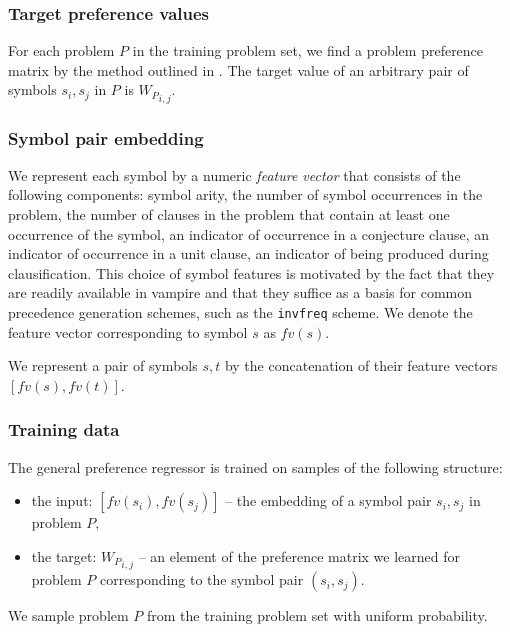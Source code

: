 \subsubsection{Target preference values}
\label{sec:target-preference-values}

For each problem \(P\) in the training problem set,
we find a problem preference matrix by the method outlined in .
The target value of an arbitrary pair of symbols \(s_i, s_j\) in \(P\) is \({W_P}_{i,j}\).

\subsubsection{Symbol pair embedding} \label{sect:embeddings}

We represent each symbol by a numeric \emph{feature vector} that consists of the following components:
symbol arity, %
the number of symbol occurrences in the problem, %
the number of clauses in the problem that contain at least one occurrence of the symbol, %
an indicator of occurrence in a conjecture clause, %
an indicator of occurrence in a unit clause, %
an indicator of being produced during clausification. %
This choice of symbol features is motivated by the fact that they
are readily available in %
\gls*{vampire}
and that they suffice as a basis for common precedence generation schemes,
such as the \texttt{invfreq} scheme.
\newcommand{\fv}{\mathit{fv}}
We denote the feature vector corresponding to symbol \(s\) as \(\fv(s)\).

We represent a pair of symbols \(s, t\)
by the concatenation of their feature vectors \([\fv(s), \fv(t)]\).

\subsubsection{Training data}

The general preference regressor is trained on samples of the following structure:

\begin{itemize}
	\item the input: \([\fv(s_i), \fv(s_j)]\) -- the embedding of a symbol pair \(s_i, s_j\) in problem \(P\),
	\item the target: \({W_P}_{i,j}\) -- an element of the preference matrix we learned for problem \(P\)
	corresponding to the symbol pair \((s_i,s_j)\).
\end{itemize}
We sample problem \(P\) from the training problem set with uniform probability.

